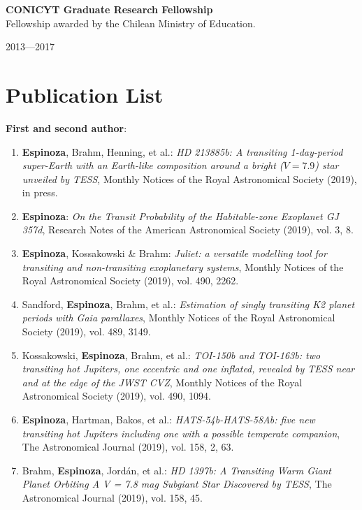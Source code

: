 \documentclass[12pt, a4paper]{article} %
\begin{document}
\begin{minipage}[t]{0.7\textwidth}
\begin{flushleft}%
  \setlength{\leftskip}{0.2cm}%
\textbf{CONICYT Graduate Research Fellowship}\\
Fellowship awarded by the Chilean Ministry of Education.
\end{flushleft}
\end{minipage}
\begin{minipage}[t]{0.3\textwidth}
\hfill 2013---2017
\end{minipage}

\section*{Publication List}
\begin{flushleft}%
  \setlength{\leftskip}{0.2cm}%
\textbf{First and second author}:
\begin{enumerate}
\setlength\itemsep{0.05cm}
\item \textbf{Espinoza}, Brahm, Henning, et al.: \textit{HD 213885b: A transiting 1-day-period super-Earth with an Earth-like composition around a bright ($V=7.9$) star unveiled by TESS}, Monthly Notices of the Royal Astronomical Society (2019), in press.
\item \textbf{Espinoza}: \textit{On the Transit Probability of the Habitable-zone Exoplanet GJ 357d}, Research Notes of the American Astronomical Society (2019), vol. 3, 8.
\item \textbf{Espinoza}, Kossakowski \& Brahm: \textit{Juliet: a versatile modelling tool for transiting and non-transiting exoplanetary systems}, Monthly Notices of the Royal Astronomical Society (2019), vol. 490, 2262. 
\item Sandford, \textbf{Espinoza}, Brahm, et al.: \textit{Estimation of singly transiting K2 planet periods with Gaia parallaxes}, Monthly Notices of the Royal Astronomical Society (2019), vol. 489, 3149.
\item Kossakowski, \textbf{Espinoza}, Brahm, et al.: \textit{TOI-150b and TOI-163b: two transiting hot Jupiters, one eccentric and one inflated, revealed by TESS near and at the edge of the JWST CVZ}, Monthly Notices of the Royal Astronomical Society (2019), vol. 490, 1094.
\item \textbf{Espinoza}, Hartman, Bakos, et al.: \textit{HATS-54b-HATS-58Ab: five new transiting hot Jupiters including one with a possible temperate companion}, The Astronomical Journal (2019), vol. 158, 2, 63.
\item Brahm, \textbf{Espinoza}, Jord\'an, et al.: \textit{HD 1397b: A Transiting Warm Giant Planet Orbiting A V = 7.8 mag Subgiant Star Discovered by TESS}, The Astronomical Journal (2019), vol. 158, 45.

\end{enumerate}
\end{flushleft}
\end{document}
